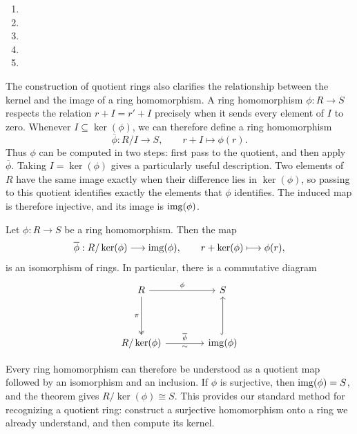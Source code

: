 \documentclass[Notebook.tex]{subfiles}
\begin{document}
\begin{solution}
	\bbni
	\begin{enumerate}[label=(\alph*),ref=\theenumi\alph*]
		\item
		\item
		\item
		\item
		\item
	\end{enumerate}
\end{solution}

\newpage

The construction of quotient rings also clarifies the relationship between the kernel and the image of a ring homomorphism. A ring homomorphism $\phi:R\to S$ respects the relation $r+I=r'+I$ precisely when it sends every element of $I$ to zero. Whenever $I\subseteq\ker(\phi)$, we can therefore define a ring homomorphism
\[
\overline{\phi}:R/I\longrightarrow S,
\qquad
r+I\longmapsto\phi(r).
\]
Thus $\phi$ can be computed in two steps: first pass to the quotient, and then apply $\overline{\phi}$. Taking $I=\ker(\phi)$ gives a particularly useful description. Two elements of $R$ have the same image exactly when their difference lies in $\ker(\phi)$, so passing to this quotient identifies exactly the elements that $\phi$ identifies. The induced map is therefore injective, and its image is $\operatorname{img}(\phi)$.

\begin{theorem}
	Let $\phi:R\to S$ be a ring homomorphism. Then the map
	\[
	\overline{\phi}:R/\ker(\phi)\longrightarrow\operatorname{img}(\phi),
	\qquad
	r+\ker(\phi)\longmapsto\phi(r),
	\]
	is an isomorphism of rings. In particular, there is a commutative diagram
	\[
	\begin{tikzcd}[row sep=4em, column sep=4em]
		R \arrow[r, "\phi"] \arrow[d, two heads, "\pi"']
		& S \\
		R/\ker(\phi) \arrow[r, "\overline{\phi}", "\sim"']
		& \img(\phi) \arrow[u, hook]
	\end{tikzcd}
	\]
\end{theorem}

Every ring homomorphism can therefore be understood as a quotient map followed by an isomorphism and an inclusion. If $\phi$ is surjective, then $\operatorname{img}(\phi)=S$, and the theorem gives $R/\ker(\phi)\cong S$. This provides our standard method for recognizing a quotient ring: construct a surjective homomorphism onto a ring we already understand, and then compute its kernel.
\end{document}
